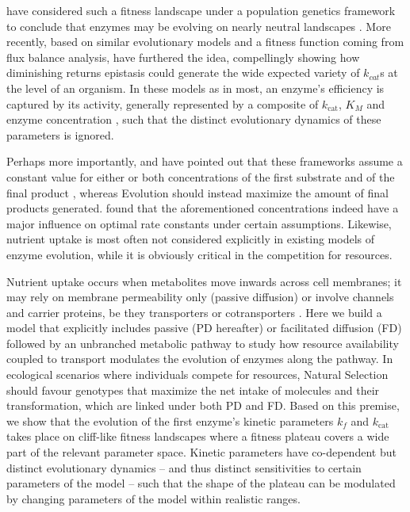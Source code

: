 \documentclass[11pt,onecolumn]{article}
\begin{document}
\citep{Hartl85} have considered such a fitness landscape under a population genetics framework to conclude that enzymes may be evolving on nearly neutral landscapes \citep{Ohta92}. More recently, based on similar evolutionary models and a fitness function coming from flux balance analysis, \citet{Heckmann18} have furthered the idea, compellingly showing how diminishing returns epistasis could generate the wide expected variety of $k_{cat}$s at the level of an organism. In these models as in most, an enzyme's efficiency is captured by its activity, generally represented by a composite of $k_\text{cat}$, $K_M$ and enzyme concentration \citep{Hartl85,Kaltenbach14}, such that the distinct evolutionary dynamics of these parameters is ignored.

Perhaps more importantly, \citep{Heinrich91} and \citep{Schuster08} have pointed out that these frameworks assume a constant value for either or both concentrations of the first substrate and of the final product \citep{Orth10}, whereas Evolution should instead maximize the amount of final products generated. \citep{Klipp94} found that the aforementioned concentrations indeed have a major influence on optimal rate constants under certain assumptions. 
Likewise, nutrient uptake is most often not considered explicitly in existing models of enzyme evolution, while it is obviously critical in the competition for resources. 

Nutrient uptake occurs when metabolites move inwards across cell membranes; it may rely on membrane permeability only (passive diffusion) or involve channels and carrier proteins, be they transporters or cotransporters \citep{Stein86a}.
Here we build a model that explicitly includes passive (PD hereafter) or facilitated diffusion (FD) followed by an unbranched metabolic pathway to study how resource availability coupled to transport modulates the evolution of enzymes along the pathway.
In ecological scenarios where individuals compete for resources, Natural Selection should favour genotypes that maximize the net intake of molecules and their transformation, which are linked under both PD and FD. Based on this premise, we show that the evolution of the first enzyme's kinetic parameters $k_f$ and $k_\text{cat}$ takes place on cliff-like fitness landscapes where a fitness plateau covers a wide part of the relevant parameter space. Kinetic parameters have co-dependent but distinct evolutionary dynamics -- and thus distinct sensitivities to certain parameters of the model -- such that the shape of the plateau can be modulated by changing parameters of the model within realistic ranges.
\end{document}

